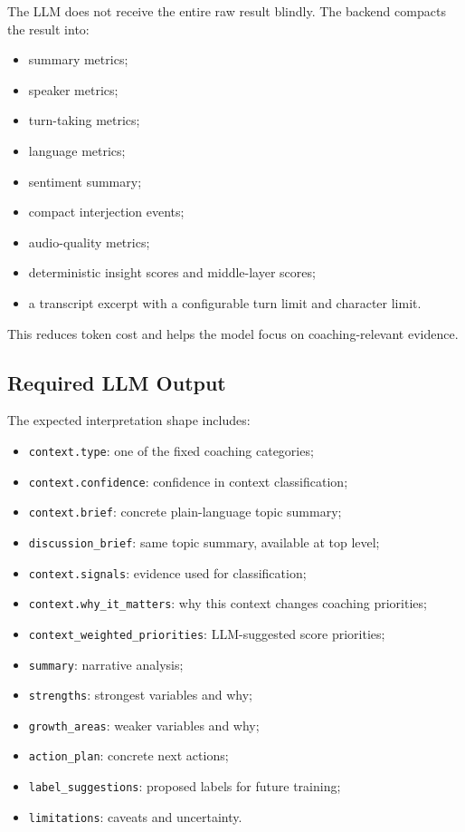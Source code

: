 \documentclass[11pt]{article}
\begin{document}
The LLM does not receive the entire raw result blindly. The backend compacts the result into:

\begin{itemize}[leftmargin=*]
  \item summary metrics;
  \item speaker metrics;
  \item turn-taking metrics;
  \item language metrics;
  \item sentiment summary;
  \item compact interjection events;
  \item audio-quality metrics;
  \item deterministic insight scores and middle-layer scores;
  \item a transcript excerpt with a configurable turn limit and character limit.
\end{itemize}

This reduces token cost and helps the model focus on coaching-relevant evidence.

\subsection{Required LLM Output}

The expected interpretation shape includes:

\begin{itemize}[leftmargin=*]
  \item \texttt{context.type}: one of the fixed coaching categories;
  \item \texttt{context.confidence}: confidence in context classification;
  \item \texttt{context.brief}: concrete plain-language topic summary;
  \item \texttt{discussion\_brief}: same topic summary, available at top level;
  \item \texttt{context.signals}: evidence used for classification;
  \item \texttt{context.why\_it\_matters}: why this context changes coaching priorities;
  \item \texttt{context\_weighted\_priorities}: LLM-suggested score priorities;
  \item \texttt{summary}: narrative analysis;
  \item \texttt{strengths}: strongest variables and why;
  \item \texttt{growth\_areas}: weaker variables and why;
  \item \texttt{action\_plan}: concrete next actions;
  \item \texttt{label\_suggestions}: proposed labels for future training;
  \item \texttt{limitations}: caveats and uncertainty.
\end{itemize}
\end{document}
